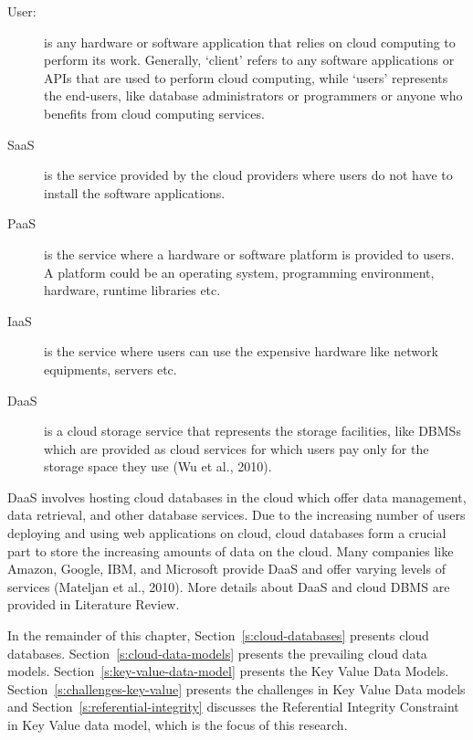 \begin{description}

\item [User:] is any hardware or software application that relies on cloud
computing to perform its work. Generally, ‘client' refers to any software applications or
\acp{API}  that are used to perform cloud computing,
while ‘users' represents the end-users, like  database administrators or
programmers or anyone who benefits from cloud computing services.

\item [\acf{SaaS}] is the service provided by the cloud
providers where users do not have to install the software applications.

\item [\acf{PaaS}] is the service where a hardware or
software platform is provided to users. A platform could be an operating system,
programming environment, hardware, runtime libraries etc.

\item [\acf{IaaS}] is the service where users can use
the expensive hardware like network equipments, servers etc.

\item [\acf{DaaS}] is a cloud storage service  that represents
the storage facilities, like  \acp{DBMS} which are provided
as cloud services for which users pay only for the storage space they use (Wu et
al., 2010).

\end{description}


\ac{DaaS} involves hosting cloud databases in the cloud which offer data
management, data retrieval, and other database services. Due to the
increasing number of users deploying and using web applications on cloud,
cloud databases form a crucial part to store the increasing amounts of data
on the cloud. Many companies like Amazon, Google, IBM, and Microsoft
provide \ac{DaaS} and offer varying levels of services (Mateljan et al., 2010). More
details about \ac{DaaS} and cloud \ac{DBMS} are provided in Literature Review.

In the remainder of this chapter, Section~\ref{s:cloud-databases} presents cloud
databases. Section~\ref{s:cloud-data-models} presents the prevailing cloud data
models. Section~\ref{s:key-value-data-model} presents the Key Value Data Models.
Section~\ref{s:challenges-key-value} presents the challenges in Key Value Data
models and Section~\ref{s:referential-integrity} discusses the Referential
Integrity Constraint in Key Value data model, which is the focus of this
research.


